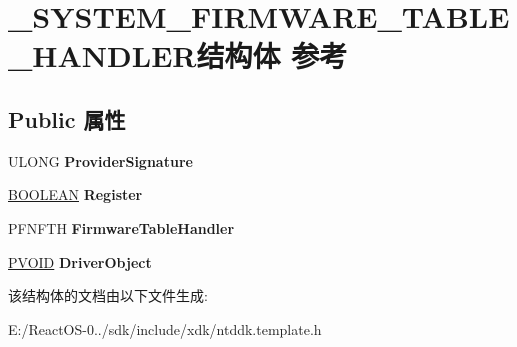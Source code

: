 \hypertarget{struct___s_y_s_t_e_m___f_i_r_m_w_a_r_e___t_a_b_l_e___h_a_n_d_l_e_r}{}\section{\+\_\+\+S\+Y\+S\+T\+E\+M\+\_\+\+F\+I\+R\+M\+W\+A\+R\+E\+\_\+\+T\+A\+B\+L\+E\+\_\+\+H\+A\+N\+D\+L\+E\+R结构体 参考}
\label{struct___s_y_s_t_e_m___f_i_r_m_w_a_r_e___t_a_b_l_e___h_a_n_d_l_e_r}
\subsection*{Public 属性}
\begin{DoxyCompactItemize}
\item 
\mbox{\label{struct___s_y_s_t_e_m___f_i_r_m_w_a_r_e___t_a_b_l_e___h_a_n_d_l_e_r_a36d27dbdb3b04787c77ead57c4c6890d}} 
U\+L\+O\+NG {\bfseries Provider\+Signature}
\item 
\mbox{\label{struct___s_y_s_t_e_m___f_i_r_m_w_a_r_e___t_a_b_l_e___h_a_n_d_l_e_r_ac2ae6966dd813c4ae93bb0b2a111d757}} 
\hyperlink{_processor_bind_8h_a112e3146cb38b6ee95e64d85842e380a}{B\+O\+O\+L\+E\+AN} {\bfseries Register}
\item 
\mbox{\label{struct___s_y_s_t_e_m___f_i_r_m_w_a_r_e___t_a_b_l_e___h_a_n_d_l_e_r_a163a6682bc05dfc531624141c871ee29}} 
P\+F\+N\+F\+TH {\bfseries Firmware\+Table\+Handler}
\item 
\mbox{\label{struct___s_y_s_t_e_m___f_i_r_m_w_a_r_e___t_a_b_l_e___h_a_n_d_l_e_r_ad6c3b3d4a55daf7ec2092ee7b67237ca}} 
\hyperlink{interfacevoid}{P\+V\+O\+ID} {\bfseries Driver\+Object}
\end{DoxyCompactItemize}


该结构体的文档由以下文件生成\+:\begin{DoxyCompactItemize}
\item 
E\+:/\+React\+O\+S-\/0../sdk/include/xdk/ntddk.\+template.\+h\end{DoxyCompactItemize}
